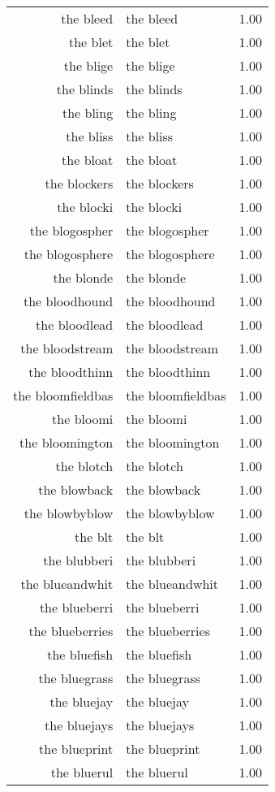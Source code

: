 \begin{table}[ht]
\begin{tabular}{rlr}
  the bleed & the bleed & 1.00 \\ 
  the blet & the blet & 1.00 \\ 
  the blige & the blige & 1.00 \\ 
  the blinds & the blinds & 1.00 \\ 
  the bling & the bling & 1.00 \\ 
  the bliss & the bliss & 1.00 \\ 
  the bloat & the bloat & 1.00 \\ 
  the blockers & the blockers & 1.00 \\ 
  the blocki & the blocki & 1.00 \\ 
  the blogospher & the blogospher & 1.00 \\ 
  the blogosphere & the blogosphere & 1.00 \\ 
  the blonde & the blonde & 1.00 \\ 
  the bloodhound & the bloodhound & 1.00 \\ 
  the bloodlead & the bloodlead & 1.00 \\ 
  the bloodstream & the bloodstream & 1.00 \\ 
  the bloodthinn & the bloodthinn & 1.00 \\ 
  the bloomfieldbas & the bloomfieldbas & 1.00 \\ 
  the bloomi & the bloomi & 1.00 \\ 
  the bloomington & the bloomington & 1.00 \\ 
  the blotch & the blotch & 1.00 \\ 
  the blowback & the blowback & 1.00 \\ 
  the blowbyblow & the blowbyblow & 1.00 \\ 
  the blt & the blt & 1.00 \\ 
  the blubberi & the blubberi & 1.00 \\ 
  the blueandwhit & the blueandwhit & 1.00 \\ 
  the blueberri & the blueberri & 1.00 \\ 
  the blueberries & the blueberries & 1.00 \\ 
  the bluefish & the bluefish & 1.00 \\ 
  the bluegrass & the bluegrass & 1.00 \\ 
  the bluejay & the bluejay & 1.00 \\ 
  the bluejays & the bluejays & 1.00 \\ 
  the blueprint & the blueprint & 1.00 \\ 
  the bluerul & the bluerul & 1.00 \\ 

\end{tabular}
\end{table}
